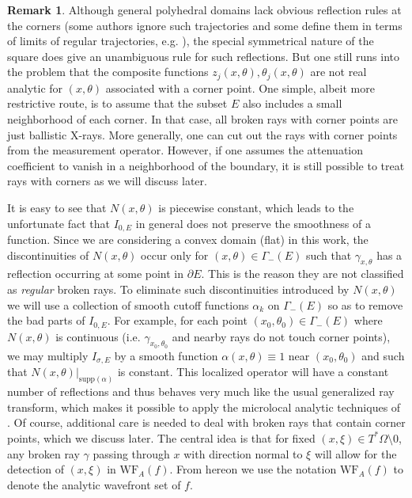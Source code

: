 \documentclass[10pt]{amsart}
\theoremstyle{definition}
\theoremstyle{definition}
\newtheorem{remark*}{Remark}
\theoremstyle{definition}
\begin{document}
\begin{remark*}Although general polyhedral domains lack obvious reflection rules at the corners (some authors ignore such trajectories and some define them in terms of limits of regular trajectories, e.g. \cite{eskin}), the special symmetrical nature of the square does give an unambiguous rule for such reflections. But one still runs into the problem that the composite functions $z_{j}(x,\theta), \theta_{j}(x,\theta)$ are not real analytic for $(x,\theta)$ associated with a corner point. One simple, albeit more restrictive route, is to assume that the subset $E$ also includes a small neighborhood of each corner. In that case, all broken rays with corner points are just ballistic X-rays. More generally, one can cut out the rays with corner points from the measurement operator. However, if one assumes the attenuation coefficient to vanish in a neighborhood of the boundary, it is still possible to treat rays with corners as we will discuss later.\end{remark*}

It is easy to see that $N(x,\theta)$ is piecewise constant, which leads to the unfortunate fact that $I_{0, E}$ in general does not preserve the smoothness of a function. Since we are considering a convex domain (flat) in this work, the discontinuities of $N(x,\theta)$ occur only for $(x,\theta) \in \Gamma_{-}(E)$ such that $\gamma_{x,\theta}$ has a reflection occurring at some point in $\partial E$. This is the reason they are not classified as \textit{regular} broken rays. To eliminate such discontinuities introduced by $N(x,\theta)$ we will use a collection of smooth cutoff functions $\alpha_{k}$ on $\Gamma_{-}(E)$ so as to remove the bad parts of $I_{0, E}$. For example, for each point $(x_{0},\theta_{0}) \in \Gamma_{-}(E)$ where $N(x,\theta)$ is continuous (i.e. $\gamma_{x_{0},\theta_{0}}$ and nearby rays do not touch corner points), we may multiply $I_{\sigma, E}$ by a smooth function $\alpha(x,\theta) \equiv 1$ near $(x_{0}, \theta_{0})$ and such that $N(x,\theta) \vert_{\mathrm{supp}(\alpha)}$ is constant. This localized operator will have a constant number of reflections and thus behaves very much like the usual generalized ray transform, which makes it possible to apply the microlocal analytic techniques of \cite{xraygeneric}. Of course, additional care is needed to deal with broken rays that contain corner points, which we discuss later. The central idea is that for fixed $(x,\xi) \in T^{*}\Omega \setminus 0$, any broken ray $\gamma$ passing through $x$ with direction normal to $\xi$ will allow for the detection of $(x,\xi)$ in $\mathrm{WF}_{A}(f)$. From hereon we use the notation $\mathrm{WF}_{A}(f)$ to denote the analytic wavefront set of $f$.
\end{document}

